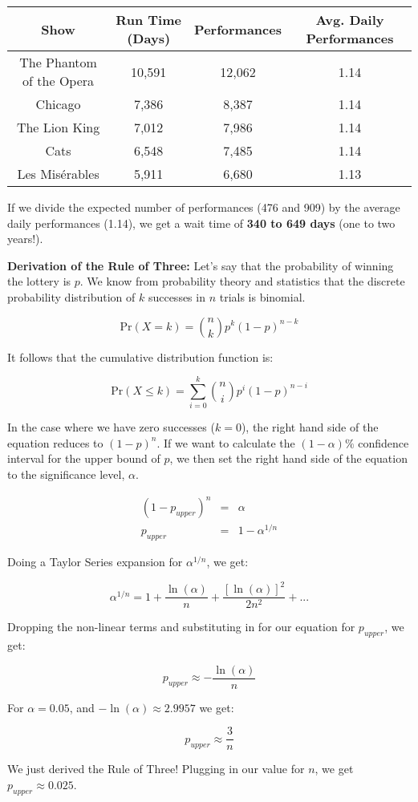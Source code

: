\documentclass[12pt]{article}
\begin{document}
\begin{center}
  \begin{tabular}{ | c | c | c | c |}
    \hline
    Show & Run Time (Days) & Performances & Avg. Daily Performances \\ \hline
    The Phantom of the Opera & 10,591 & 12,062 & 1.14\\ \hline
    Chicago & 7,386 & 8,387 & 1.14\\ \hline
    The Lion King & 7,012 & 7,986 & 1.14\\ \hline
    Cats & 6,548 & 7,485 & 1.14\\ \hline
    Les Mis\'{e}rables & 5,911 & 6,680 & 1.13\\
    \hline
  \end{tabular}
\end{center}

If we divide the expected number of performances (476 and 909) by the average daily performances (1.14), we get a wait time of \textbf{340 to 649 days} (one to two years!).

\vspace{5mm}

\textbf{Derivation of the Rule of Three:}
Let's say that the probability of winning the lottery is $p$. We know from probability theory and statistics that the discrete probability distribution of $k$ successes in $n$ trials is binomial. 

$$ \mbox{Pr}(X = k) = {n \choose k} p^k (1 - p)^{n-k} $$

It follows that the cumulative distribution function is:

$$ \mbox{Pr}(X \leq k) = \sum_{i = 0}^{k}  {n \choose i} p^i (1 - p)^{n-i} $$

In the case where we have zero successes ($k=0$), the right hand side of the equation reduces to $(1-p)^n$. If we want to calculate the $(1 - \alpha)\%$ confidence interval for the upper bound of $p$, we then set the right hand side of the equation to the significance level, $\alpha$. 

\begin{eqnarray*}
(1 - p_{upper})^n &=& \alpha\\
p_{upper} &=& 1 - \alpha^{1/n}
\end{eqnarray*}

Doing a Taylor Series expansion for $\alpha^{1/n}$, we get:

$$ \alpha^{1/n} = 1 + \frac{\ln(\alpha)}{n} + \frac{[\ln(\alpha)]^2}{2n^2} + ... $$

Dropping the non-linear terms and substituting in for our equation for $p_{upper}$, we get:

$$ p_{upper} \approx -\frac{\ln(\alpha)}{n}$$

For $\alpha = 0.05$, and $-\ln(\alpha) \approx 2.9957$ we get: 

$$ p_{upper} \approx \frac{3}{n}$$

We just derived the Rule of Three! Plugging in our value for $n$, we get $p_{upper} \approx 0.025$. 
\end{document}
